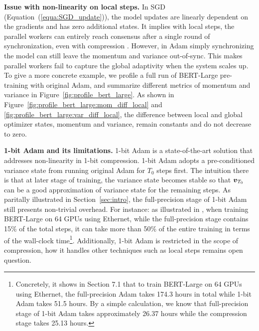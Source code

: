 \textbf{Issue with non-linearity on local steps.}
In SGD (Equation~(\ref{equa:SGD_update})), the model updates are linearly dependent on the gradients and has zero additional states. It implies with local steps, the parallel workers can entirely reach consensus after a single round of synchronization, even with compression \citep{basu2020qsparse}. However, in Adam simply synchronizing the model can still leave the momentum and variance out-of-sync. This makes parallel workers fail to capture the global adaptivity when the system scales up.
To give a more concrete example, we profile a full run of BERT-Large pre-training with original Adam, and summarize different metrics of momentum and variance in Figure~\ref{fig:profile_bert_large}. As shown in Figure~\ref{fig:profile_bert_large:mom_diff_local} and \ref{fig:profile_bert_large:var_diff_local}, the difference between local and global optimizer states, momentum and variance, remain constants and do not decrease to zero.

\textbf{1-bit Adam and its limitations.}
1-bit Adam \citep{tang20211} is a state-of-the-art solution that addresses non-linearity in 1-bit compression. 1-bit Adam adopts a pre-conditioned variance state from running original Adam for $T_0$ steps first. 
The intuition there is that at later stage of training, the variance state becomes stable so that $\boldsymbol{v}_{T_0}$ can be a good approximation of variance state for the remaining steps. 
As paritally illustrated in Section~\ref{sec:intro}, the full-precision stage of 1-bit Adam still presents non-trivial overhead. For instance: as illustrated in \citep{tang20211}, when training BERT-Large on 64 GPUs using Ethernet, while the full-precision stage contains 15\% of the total steps, it can take more than 50\% of the entire training in terms of the wall-clock time\footnote{Concretely, it shows in \citep{tang20211} Section 7.1 that to train BERT-Large on 64 GPUs using Ethernet, the full-precision Adam takes 174.3 hours in total while 1-bit Adam takes 51.5 hours. By a simple calculation, we know that full-precision stage of 1-bit Adam takes approximately 26.37 hours while the compression stage takes 25.13 hours.}.
Additionally, 1-bit Adam is restricted in the scope of compression, how it handles other techniques such as local steps remains open question.

